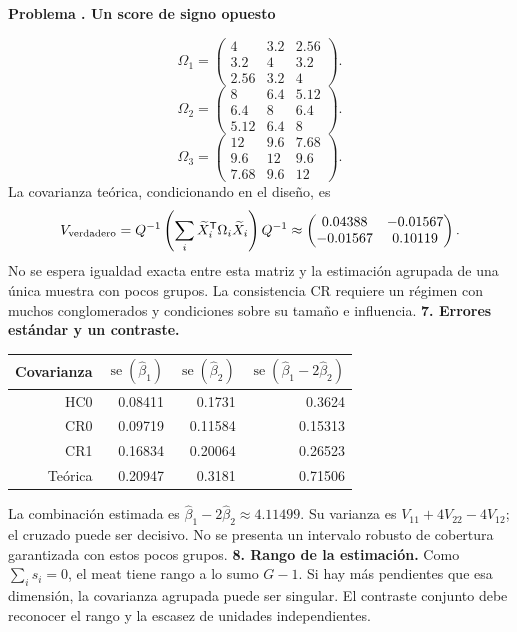 \documentclass[11pt,a4paper]{article}
\newcommand{\T}{^{\mathsf T}}
\theoremstyle{definition}
\newcounter{problema}
\newenvironment{resuelto}[1]{\refstepcounter{problema}\par\medskip\Needspace{6\baselineskip}\textbf{Problema \theproblema. #1}\par}{\par\medskip}
\DeclareMathOperator{\se}{se}
\begin{document}
\begin{resuelto}{Un score de signo opuesto}
\[
\Omega_{1}=\begin{pmatrix}
4&3.2&2.56\\3.2&4&3.2\\2.56&3.2&4
\end{pmatrix}.
\]
\[
\Omega_{2}=\begin{pmatrix}
8&6.4&5.12\\6.4&8&6.4\\5.12&6.4&8
\end{pmatrix}.
\]
\[
\Omega_{3}=\begin{pmatrix}
12&9.6&7.68\\9.6&12&9.6\\7.68&9.6&12
\end{pmatrix}.
\]
La covarianza teórica, condicionando en el diseño, es
\[
V_{\rm verdadero}=Q^{-1}\left(\sum_i\widetilde X_i\T\Omega_i\widetilde X_i\right)Q^{-1}\approx\begin{pmatrix}
0.04388&-0.01567\\-0.01567&0.10119
\end{pmatrix}.
\]
No se espera igualdad exacta entre esta matriz y la estimación agrupada de una única muestra con pocos grupos. La consistencia CR requiere un régimen con muchos conglomerados y condiciones sobre su tamaño e influencia.
\textbf{7. Errores estándar y un contraste.}

\begin{center}\small
\begin{tabular}{rrrr}
\toprule
Covarianza&$\se(\widehat\beta_1)$&$\se(\widehat\beta_2)$&$\se(\widehat\beta_1-2\widehat\beta_2)$\\
\midrule
HC0&0.08411&0.1731&0.3624\\
CR0&0.09719&0.11584&0.15313\\
CR1&0.16834&0.20064&0.26523\\
Teórica&0.20947&0.3181&0.71506\\
\bottomrule
\end{tabular}
\end{center}
La combinación estimada es $\widehat\beta_1-2\widehat\beta_2\approx4.11499$. Su varianza es $V_{11}+4V_{22}-4V_{12}$; el cruzado puede ser decisivo. No se presenta un intervalo robusto de cobertura garantizada con estos pocos grupos.
\textbf{8. Rango de la estimación.} Como $\sum_i s_i=0$, el meat tiene rango a lo sumo $G-1$. Si hay más pendientes que esa dimensión, la covarianza agrupada puede ser singular. El contraste conjunto debe reconocer el rango y la escasez de unidades independientes.
\end{resuelto}
\end{document}
